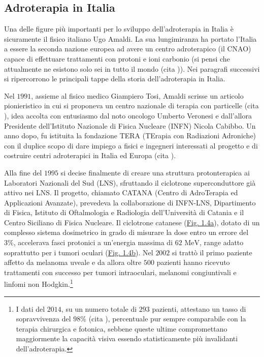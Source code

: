 \documentclass[12pt,a4paper,twoside]{report}
\begin{document}
	\subsection{Adroterapia in Italia}
	Una delle figure più importanti per lo sviluppo dell'adroterapia in Italia è sicuramente il fisico italiano Ugo Amaldi. La sua lungimiranza ha portato l'Italia a essere la seconda nazione europea ad avere un centro adroterapico (il CNAO) capace di effettuare trattamenti con protoni e ioni carbonio (si pensi che attualmente ne esistono solo sei in tutto il mondo (cita
	)). Nei paragrafi successivi si ripercorrono le principali tappe della storia dell'adroterapia in Italia.
	
	Nel $1991$, assieme al fisico medico Giampiero Tosi, Amaldi scrisse un articolo pionieristico in cui si proponeva un centro nazionale di terapia con particelle (cita
	), idea accolta con entusiasmo dal noto oncologo Umberto Veronesi e dall'allora Presidente dell'Istituto Nazionale di Fisica Nucleare (INFN) Nicola Cabibbo. Un anno dopo, fu istituita la fondazione TERA (TErapia con Radiazioni Adroniche) con il duplice scopo di dare impiego a fisici e ingegneri interessati al progetto e di costruire centri adroterapici in Italia ed Europa (cita
	).
	
	Alla fine del $1995$ si decise finalmente di creare una struttura protonterapica ai Laboratori Nazionali del Sud (LNS), sfruttando il ciclotrone superconduttore già attivo nei LNS. Il progetto, chiamato CATANA (Centro di AdroTerapia ed Applicazioni Avanzate), prevedeva la collaborazione di INFN-LNS, Dipartimento di Fisica, Istituto di Oftalmologia e Radiologia dell'Università di Catania e il Centro Siciliano di Fisica Nucleare. Il ciclotrone catanese (\hyperref[fig:catana1]{Fig. 1.4a}), dotato di un complesso sistema dosimetrico in grado di misurare la dose entro un errore del $3\%$, accelerava fasci protonici a un'energia massima di $62 \mbox{ MeV}$, range adatto soprattutto per i tumori oculari (\hyperref[fig:catana2]{Fig. 1.4b}). Nel $2002$ si trattò il primo paziente affetto da melanoma uveale e da allora oltre $500$ pazienti hanno ricevuto trattamenti con successo per tumori intraoculari, melanomi congiuntivali e linfomi non Hodgkin.\footnote{I dati del $2014$, su un numero totale di $293$ pazienti, attestano un tasso di sopravvivenza del $98\%$ (cita
	), percentuale pur sempre comparabile con la terapia chirurgica e fotonica, sebbene queste ultime compromettano maggiormente la capacità visiva essendo statisticamente più invalidanti dell'adroterapia.}
	
\end{document}

